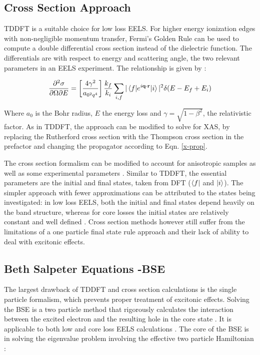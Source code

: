 \subsection{Cross Section Approach}
TDDFT is a suitable choice for low loss EELS.  For higher energy ionization edges with non-negligible momentum transfer, Fermi's Golden Rule can be used to compute a double differential cross section instead of the dielectric function.  The differentials are with respect to energy and scattering angle, the two relevant parameters in an EELS experiment.  The relationship is given by \cite{hebert_practical_2007}:

\begin{equation}
		\frac{\partial^2 \sigma}{\partial \Omega \partial E} = \left[\frac{4\gamma^2}{a_{\mathrm{0}^2q^4}}\right] \frac{k_f}{k_i} \sum_{i,f}|\mel{f}{e^{i\textbf{q}\cdot\textbf{r}}}{i}|^2\delta(E-E_f+E_i)
		\label{telnes_eq}
\end{equation}

Where $a_0$ is the Bohr radius, $E$ the energy loss and $\gamma = \sqrt{1- \beta^2}$, the relativistic factor.  As in TDDFT, the approach can be modified to solve for XAS, by replacing the Rutherford cross section with the Thompson cross section in the prefactor and changing the propagator according to Eqn. \ref{x-prop}.



The cross section formalism can be modified to account for anisotropic samples as well as some experimental parameters \cite{hebert_practical_2007}. Similar to TDDFT, the essential parameters are the initial and final states, taken from DFT ($\bra{f}$ and $\ket{i}$).  The simpler approach with fewer approximations can be attributed to the states being investigated: in low loss EELS, both the initial and final states depend heavily on the band structure, whereas for core losses the initial states are relatively constant and well defined \cite{hebert_practical_2007}.  Cross section methods however still suffer from the limitations of a one particle final state rule approach and their lack of ability to deal with excitonic effects.  

\subsection{Beth Salpeter Equations -BSE}

The largest drawback of TDDFT and cross section calculations is the single particle formalism, which prevents proper treatment of excitonic effects. Solving the BSE is a two particle method that rigorously calculates the  interaction between the excited electron and the resulting hole in the core state \cite{salpeter_relativistic_1951}.  It is applicable to both low and core loss EELS calculations \cite{exciting}.  The core of the BSE is in solving the eigenvalue problem involving the effective two particle Hamiltonian \cite{draxl_bse_2009}: 


